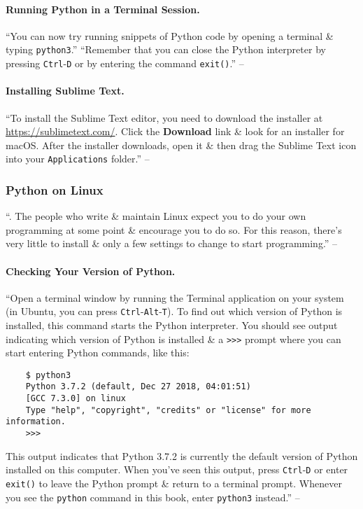 \documentclass[oneside]{book}
\numberwithin{equation}{section}
\begin{document}
\paragraph{Running Python in a Terminal Session.} ``You can now try running snippets of Python code by opening a terminal \& typing \texttt{python3}.'' ``Remember that you can close the Python interpreter by pressing \texttt{Ctrl}-\texttt{D} or by entering the command \texttt{exit()}.'' -- \cite[p. 8]{Matthes2019}

\paragraph{Installing Sublime Text.} ``To install the Sublime Text editor, you need to download the installer at \url{https://sublimetext.com/}. Click the \textbf{Download} link \& look for an installer for macOS. After the installer downloads, open it \& then drag the Sublime Text icon into your \texttt{Applications} folder.'' -- \cite[p. 8]{Matthes2019}

\subsubsection{Python on Linux}
``. The people who write \& maintain Linux expect you to do your own programming at some point \& encourage you to do so. For this reason, there's very little to install \& only a few settings to change to start programming.'' -- \cite[p. 8]{Matthes2019}

\paragraph{Checking Your Version of Python.} ``Open a terminal window by running the Terminal application on your system (in Ubuntu, you can press \texttt{Ctrl}-\texttt{Alt}-\texttt{T}). To find out which version of Python is installed, this command starts the Python interpreter. You should see output indicating which version of Python is installed \& a \texttt{>>>} prompt where you can start entering Python commands, like this:
\begin{verbatim}
	$ python3
	Python 3.7.2 (default, Dec 27 2018, 04:01:51)
	[GCC 7.3.0] on linux
	Type "help", "copyright", "credits" or "license" for more information.
	>>>
\end{verbatim}
This output indicates that Python 3.7.2 is currently the default version of Python installed on this computer. When you've seen this output, press \texttt{Ctrl}-\texttt{D} or enter \texttt{exit()} to leave the Python prompt \& return to a terminal prompt. Whenever you see the \texttt{python} command in this book, enter \texttt{python3} instead.'' -- \cite[pp. 8--9]{Matthes2019}
\end{document}
